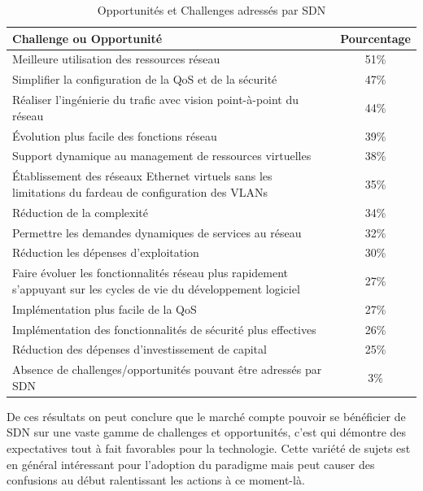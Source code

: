\begin{table}[!h]
\centering
\begin{tabular}{|p{12cm}|c|}
\hline 
\bf Challenge ou Opportunité & \bf Pourcentage \\ 
\hline 
Meilleure utilisation des ressources réseau & 51\% \\ 
\hline 
Simplifier la configuration de la QoS et de la sécurité  & 47\%  \\
\hline 
Réaliser l'ingénierie du trafic avec vision point-à-point du réseau & 44\% \\ 
\hline 
Évolution plus facile des fonctions réseau & 39\% \\ 
\hline 
Support dynamique au management de ressources virtuelles  & 38\% \\ 
\hline 
Établissement des réseaux Ethernet virtuels sans les limitations du fardeau de configuration des VLANs & 35\% \\ 
\hline 
Réduction de la complexité & 34\% \\ 
\hline 
Permettre les demandes dynamiques de services au réseau & 32\% \\ 
\hline 
Réduction les dépenses d'exploitation & 30\% \\ 
\hline 
Faire évoluer les fonctionnalités réseau plus rapidement s'appuyant sur les cycles de vie du développement logiciel & 27\% \\ 
\hline 
Implémentation plus facile de la QoS & 27\% \\ 
\hline 
Implémentation des fonctionnalités de sécurité plus effectives & 26\% \\ 
\hline 
Réduction des dépenses d'investissement de capital & 25\% \\ 
\hline 
Absence de challenges/opportunités pouvant être adressés par SDN & 3\% \\ 
\hline 
\end{tabular}
\caption{Opportunités et Challenges adressés par SDN \cite{2013GuideSDNNVTable11}}
\end{table} 

\clearpage

De ces résultats on peut conclure que le marché compte pouvoir se bénéficier de SDN sur une vaste gamme de challenges et opportunités, c'est qui démontre des expectatives tout à fait favorables pour la technologie. Cette variété de sujets est en général intéressant pour l'adoption du \gls{paradigme} mais peut causer des confusions au début ralentissant les actions à ce moment-là.


